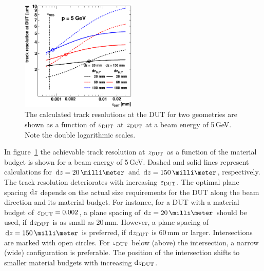 \begin{figure}[t]
  \centering
  \includegraphics[width=0.49\textwidth]{figures/trackres_vs_epsdut_DESY} %
   \caption[Track resolution as a function of the beam energy]{
   The calculated track resolutions at the DUT for two geometries are shown as a function of $\mathnormal{\varepsilon_{\textrm{DUT}}}$ at $z_{\textrm{DUT}}$ at a beam energy of 5\,GeV. 
   Note the double logarithmic scales. 
   }
 \label{fig:CalcResoP_DUT}
\end{figure}

In figure~\ref{fig:CalcResoP_DUT} the achievable track resolution at $z_{\textrm{DUT}}$ as a function of the material budget is shown for a beam energy of 5\,GeV.
Dashed and solid lines represent calculations for $\dz = 20\,\milli\meter$ and $\dz = 150\,\milli\meter$, respectively. 
The track resolution deteriorates with increasing $\mathnormal{\varepsilon_{\textrm{DUT}}}$. 
The optimal plane spacing $\textrm{d}z$ depends on the actual size requirements for the DUT along the beam direction and its material budget.
For instance, for a DUT with a material budget of $\mathnormal{\varepsilon_{\textrm{DUT}}} = 0.002$, a plane spacing of $\dz = 20\,\milli\meter$ should be used, if $\textrm{d}z_{\textrm{DUT}}$ is as small as 20\,mm. 
However, a plane spacing of $\dz = 150\,\milli\meter$ is preferred, if $\textrm{d}z_{\textrm{DUT}}$ is 60\,mm or larger. 
Intersections are marked with open circles. 
For $\mathnormal{\varepsilon_{\textrm{DUT}}}$ below (above) the intersection, a narrow (wide) configuration is preferable. 
The position of the intersection shifts to smaller material budgets with increasing $\textrm{d}z_{\textrm{DUT}}$. 

